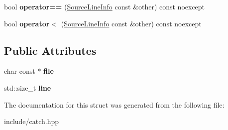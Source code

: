 \begin{DoxyCompactItemize}
\item 
bool {\bfseries operator==} (\hyperlink{structCatch_1_1SourceLineInfo}{Source\+Line\+Info} const \&other) const noexcept\hypertarget{structCatch_1_1SourceLineInfo_af07e4fdeddf8409b91e4f842f6264cf8}{}\label{structCatch_1_1SourceLineInfo_af07e4fdeddf8409b91e4f842f6264cf8}

\item 
bool {\bfseries operator$<$} (\hyperlink{structCatch_1_1SourceLineInfo}{Source\+Line\+Info} const \&other) const noexcept\hypertarget{structCatch_1_1SourceLineInfo_af77415416919d2d6030b4be085b92f7a}{}\label{structCatch_1_1SourceLineInfo_af77415416919d2d6030b4be085b92f7a}

\end{DoxyCompactItemize}
\subsection*{Public Attributes}
\begin{DoxyCompactItemize}
\item 
char const $\ast$ {\bfseries file}\hypertarget{structCatch_1_1SourceLineInfo_ad65537703e9f08c1fa7777fbc3f0c617}{}\label{structCatch_1_1SourceLineInfo_ad65537703e9f08c1fa7777fbc3f0c617}

\item 
std\+::size\+\_\+t {\bfseries line}\hypertarget{structCatch_1_1SourceLineInfo_a841e5d696c7b9cde24e45e61dd979c77}{}\label{structCatch_1_1SourceLineInfo_a841e5d696c7b9cde24e45e61dd979c77}

\end{DoxyCompactItemize}


The documentation for this struct was generated from the following file\+:\begin{DoxyCompactItemize}
\item 
include/catch.\+hpp\end{DoxyCompactItemize}
